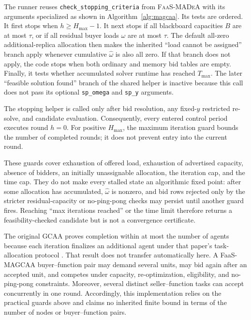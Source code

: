The runner reuses \texttt{check\_stopping\_criteria} from
\textsc{FaaS-MADeA} with its arguments specialized as shown in
Algorithm~\ref{alg:magcaa}. Its tests are ordered. It first stops when
$h\ge H_{\max}-1$. It next stops if all blackboard capacities $B$ are at
most $\tau$, or if all residual buyer loads $\omega$ are at most $\tau$.
The default all-zero additional-replica allocation then makes the inherited
``load cannot be assigned'' branch apply whenever cumulative
$\widehat\omega$ is also all zero. If that branch does not apply, the code
stops when both ordinary and memory bid tables are empty. Finally, it tests
whether accumulated solver runtime has reached $T_{\max}$. The later
``feasible solution found'' branch of the shared helper is inactive because
this call does not pass its optional \texttt{sp\_omega} and \texttt{sp\_y}
arguments.

The stopping helper is called only after bid resolution, any fixed-$y$
restricted re-solve, and candidate evaluation. Consequently, every entered
control period executes round $h=0$. For positive $H_{\max}$, the maximum
iteration guard bounds the number of completed rounds; it does not prevent
entry into the current round.

These guards cover exhaustion of offered load, exhaustion of advertised
capacity, absence of bidders, an initially unassignable allocation, the
iteration cap, and the time cap. They do not make every stalled state an
algorithmic fixed point: after some allocation has accumulated,
$\widehat\omega$ is nonzero, and bid rows rejected only by the stricter
residual-capacity or no-ping-pong checks may persist until another guard
fires. Reaching ``max iterations reached'' or the time limit therefore
returns a feasibility-checked candidate but is not a convergence
certificate.

The original GCAA proves completion within at most the number of agents
because each iteration finalizes an additional agent under that paper's
task-allocation protocol \citep{braquetbakolas2021}. That result does not
transfer automatically here. A FaaS-MAGCAA buyer--function pair may demand
several units, may bid again after an accepted unit, and competes under
capacity, re-optimization, eligibility, and no-ping-pong constraints.
Moreover, several distinct seller--function tasks can accept concurrently
in one round. Accordingly, this implementation relies on the practical
guards above and claims no inherited finite bound in terms of the number of
nodes or buyer--function pairs.


